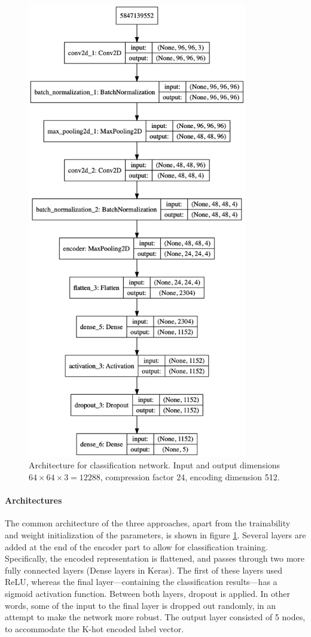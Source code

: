 \begin{figure}[!htbp]
	\begin{center}
		\includegraphics[height=20cm, keepaspectratio]{images/class_architecture}
		\caption{Architecture for classification network. Input and output dimensions $64 \times 64\times3 = 12288$, compression factor 24, encoding dimension 512.}
		\label{fig:class}
	\end{center}
\end{figure}


\paragraph{Architectures} 
The common architecture of the three approaches, apart from the trainability and weight initialization of the parameters, is shown in figure \ref{fig:class}. Several layers are added at the end of the encoder part to allow for classification training. Specifically, the encoded representation is flattened, and passes through two more fully connected layers (Dense layers in Keras). The first of these layers used ReLU, whereas the final layer---containing the classification results---has a sigmoid activation function. Between both layers, dropout is applied. In other words, some of the input to the final layer is dropped out randomly, in an attempt to make the network more robust. The output layer consisted of 5 nodes, to accommodate the K-hot encoded label vector.


